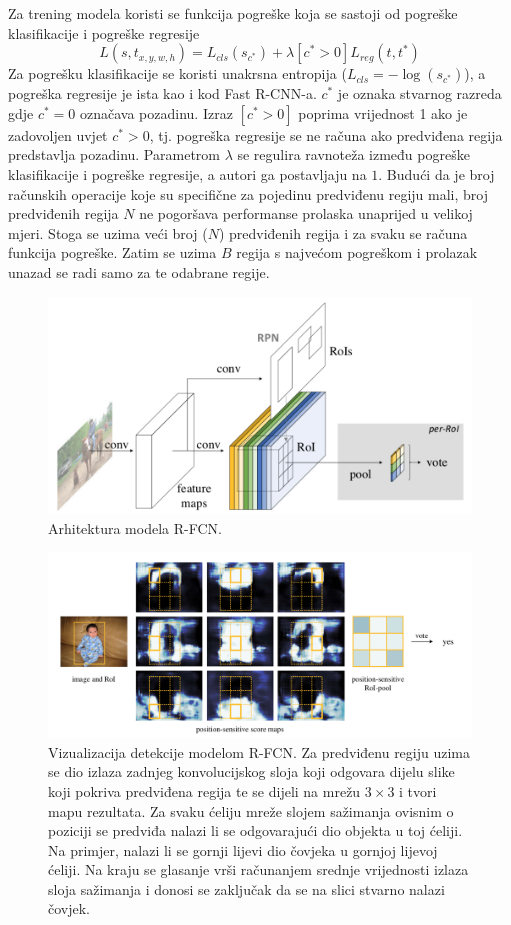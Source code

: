 Za trening modela koristi se funkcija pogreške koja se sastoji od pogreške klasifikacije i pogreške regresije
\[
	L(s, t_{x, y, w, h}) = L_{cls}(s_{c^*}) + \lambda [c^* > 0]L_{reg}(t, t^*)
\]
Za pogrešku klasifikacije se koristi unakrsna entropija ($L_{cls} = - \log(s_{c^*})$), a pogreška regresije je ista kao i kod Fast R-CNN-a. $c^*$ je oznaka stvarnog razreda gdje $c^* = 0$ označava pozadinu. Izraz $[c^* > 0]$ poprima vrijednost 1 ako je zadovoljen uvjet $c^* > 0$, tj. pogreška regresije se ne računa ako predviđena regija predstavlja pozadinu. Parametrom $\lambda$ se regulira ravnoteža između pogreške klasifikacije i pogreške regresije, a autori ga postavljaju na $1$.
Budući da je broj računskih operacije koje su specifične za pojedinu predviđenu regiju mali, broj predviđenih regija $N$ ne pogoršava performanse prolaska unaprijed u velikoj mjeri. Stoga se uzima veći broj ($N$) predviđenih regija i za svaku se računa funkcija pogreške. Zatim se uzima $B$ regija s najvećom pogreškom i prolazak unazad se radi samo za te odabrane regije.

 \begin{figure}
	\centering
	\includegraphics[scale=0.9]{img/rfcn_arhitektura.png}
	\caption{Arhitektura modela R-FCN.}
	\label{rfcn_arhitektura}
\end{figure}

 \begin{figure}
	\centering
	\includegraphics[scale=0.7]{img/rfcn_vizualizacija.png}
	\caption{Vizualizacija detekcije modelom R-FCN. Za predviđenu regiju uzima se dio izlaza zadnjeg konvolucijskog sloja koji odgovara dijelu slike koji pokriva predviđena regija te se dijeli na mrežu $3 \times 3$ i tvori mapu rezultata. Za svaku ćeliju mreže slojem sažimanja ovisnim o poziciji se predviđa nalazi li se odgovarajući dio objekta u toj ćeliji. Na primjer, nalazi li se gornji lijevi dio čovjeka u gornjoj lijevoj ćeliji. Na kraju se glasanje vrši računanjem srednje vrijednosti izlaza sloja sažimanja i donosi se zaključak da se na slici stvarno nalazi čovjek.}
	\label{rfcn_vizualizacija}
\end{figure}